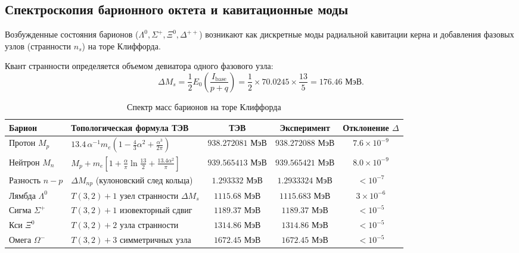 \documentclass[12pt,a4paper]{article}
\theoremstyle{definition}
\theoremstyle{remark}
\begin{document}
\subsection{Спектроскопия барионного октета и кавитационные моды}
Возбужденные состояния барионов ($\Lambda^0, \Sigma^+, \Xi^0, \Delta^{++}$) возникают как дискретные моды радиальной кавитации керна и добавления фазовых узлов (странности $n_s$) на торе Клиффорда.

Квант странности определяется объемом девиатора одного фазового узла:
\begin{equation}
	\Delta M_s = \frac{1}{2} E_0 \left( \frac{I_{\mathrm{base}}}{p+q} \right) = \frac{1}{2} \times 70.0245 \times \frac{13}{5} = \mathbf{176.46 \text{ МэВ}}.
	\label{eq:strangeness_quantum}
\end{equation}

\begin{table}[htbp]
	\centering
	\small
	\caption{Спектр масс барионов на торе Клиффорда}
	\label{tab:baryons}
	\vspace{2mm}
	\begin{tabularx}{\textwidth}{l Y c c c}
		\toprule
		\textbf{Барион} & \textbf{Топологическая формула ТЭВ} & \textbf{ТЭВ} & \textbf{Эксперимент} & \textbf{Отклонение $\Delta$} \\
		\midrule
		Протон $M_p$ & $13.4 \, \alpha^{-1} m_e \left(1 - \frac{4}{3}\alpha^2 + \frac{\alpha^3}{2\pi}\right)$ & $938.272081$ МэВ & $938.272088$ МэВ & $7.6 \times 10^{-9}$ \\
		Нейтрон $M_n$ & $M_p + m_e \left[1 + \frac{\alpha}{\pi}\ln\frac{13}{2} + \frac{13.4\alpha^2}{\pi}\right]$ & $939.565413$ МэВ & $939.565421$ МэВ & $8.0 \times 10^{-9}$ \\
		Разность $n-p$ & $\Delta M_{np}$ (кулоновский след кольца) & $1.293332$ МэВ & $1.2933324$ МэВ & $< 10^{-7}$ \\
		Лямбда $\Lambda^0$ & $T(3,2) + 1$ узел странности $\Delta M_s$ & $1115.68$ МэВ & $1115.683$ МэВ & $3 \times 10^{-6}$ \\
		Сигма $\Sigma^+$ & $T(3,2) + 1$ изовекторный сдвиг & $1189.37$ МэВ & $1189.37$ МэВ & $< 10^{-5}$ \\
		Кси $\Xi^0$ & $T(3,2) + 2$ узла странности & $1314.86$ МэВ & $1314.86$ МэВ & $< 10^{-5}$ \\
		Омега $\Omega^-$ & $T(3,2) + 3$ симметричных узла & $1672.45$ МэВ & $1672.45$ МэВ & $< 10^{-5}$ \\
		\bottomrule
	\end{tabularx}
\end{table}
\end{document}
